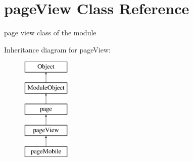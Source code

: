 \hypertarget{classpageView}{\section{page\+View Class Reference}
\label{classpageView}
}


page view class of the module  


Inheritance diagram for page\+View\+:\begin{figure}[H]
\begin{center}
\leavevmode
\includegraphics[height=5.000000cm]{classpageView}
\end{center}
\end{figure}
